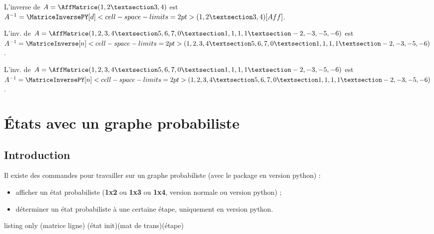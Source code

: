 \documentclass[french,a4paper,11pt]{article}
\newcommand\cmaj[1]{\tcbox[vignetteMaJ]{#1}\xspace}
\begin{document}
\begin{PresentationCode}{}
L'inverse de $A=\AffMatrice(1,2 § 3,4)$ est
$A^{-1}=\MatriceInversePY[d]<cell-space-limits=2pt>(1,2 § 3,4)[Aff]$.
\end{PresentationCode}

\begin{PresentationCode}{}
L'inv. de $A=\AffMatrice(1,2,3,4 § 5,6,7,0 § 1,1,1,1 § -2,-3,-5,-6)$ est
$A^{-1}=
\MatriceInverse[n]<cell-space-limits=2pt>(1,2,3,4 § 5,6,7,0 § 1,1,1,1 § -2,-3,-5,-6)$.
\end{PresentationCode}

\begin{PresentationCode}{}
L'inv. de $A=\AffMatrice(1,2,3,4 § 5,6,7,0 § 1,1,1,1 § -2,-3,-5,-6)$ est
$A^{-1}=
\MatriceInversePY[n]<cell-space-limits=2pt>(1,2,3,4 § 5,6,7,0 § 1,1,1,1 § -2,-3,-5,-6)$.
\end{PresentationCode}

\pagebreak

\section{États avec un graphe probabiliste}

\subsection{Introduction}

\begin{cautionblock}
\cmaj{0.1.4} Il existe des commandes pour travailler sur un graphe probabiliste (avec le package en version \textsf{python}) :

\begin{itemize}
	\item afficher un état probabiliste (\textbf{1x2} ou \textbf{1x3} ou \textbf{1x4}, version normale ou version \textsf{python}) ;
	\item déterminer un état probabiliste à une certaine étape, uniquement en version \textsf{python}.
\end{itemize}
\vspace*{-\baselineskip}\leavevmode
\end{cautionblock}

\begin{PresentationCode}{listing only}
(matrice ligne)
(état init)(mat de trans)(étape)
\end{PresentationCode}
\end{document}
